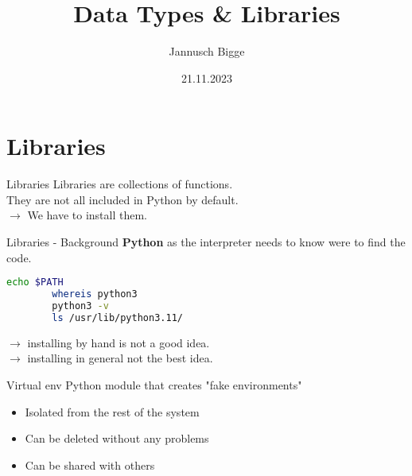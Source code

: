 \documentclass{beamer}
\title{Data Types \& Libraries}
\author{Jannusch Bigge}
\date{21.11.2023}
\begin{document}
\begin{frame}
    \titlepage
\end{frame}

\section{Libraries}

\begin{frame}{Libraries}
    Libraries are collections of functions.\\
    They are not all included in Python by default.\\
    \pause
    $\rightarrow$ We have to install them.\\
\end{frame}

\begin{frame}[fragile]{Libraries - Background}
    \textbf{Python} as the interpreter needs to know were to find the code.\\
    \pause
    \begin{lstlisting}[backgroundcolor = \color{lightgray},language=bash]
        echo $PATH
        whereis python3
        python3 -v
        ls /usr/lib/python3.11/
    \end{lstlisting}
    \pause
    $\rightarrow$ installing by hand is not a good idea.\\
    \pause
    $\rightarrow$ installing in general not the best idea.
\end{frame}

\begin{frame}{Virtual env}
    Python module that creates "fake environments"\\
    \begin{itemize}
        \item Isolated from the rest of the system
        \item Can be deleted without any problems
        \item Can be shared with others
    \end{itemize}
    
\end{frame}
\end{document}
